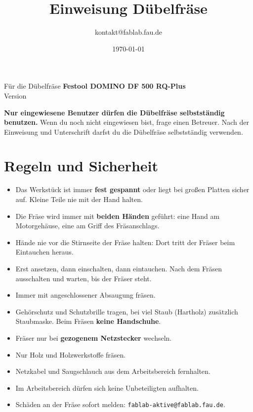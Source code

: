 \documentclass{\basedir/fablab-document}
\date{\today}
\author{kontakt@fablab.fau.de}
\title{Einweisung Dübelfräse}
\begin{document}
	\maketitle
	\begin{center}
		Für die Dübelfräse \textbf{Festool DOMINO DF 500 RQ-Plus}\\[1mm]
		{\small Version \Version}
	\end{center}

	\textbf{Nur eingewiesene Benutzer dürfen die Dübelfräse selbstständig benutzen.}
	Wenn du noch nicht eingewiesen bist, frage einen Betreuer. Nach der Einweisung und Unterschrift darfst du die Dübelfräse selbstständig verwenden.

	\section{Regeln und Sicherheit}

	\begin{itemize}
		\item Das Werkstück ist immer \textbf{fest gespannt} oder liegt bei großen Platten sicher auf. Kleine Teile nie mit der Hand halten.
		\item Die Fräse wird immer mit \textbf{beiden Händen} geführt: eine Hand am Motorgehäuse, eine am Griff des Fräsanschlags.
		\item Hände nie vor die Stirnseite der Fräse halten: Dort tritt der Fräser beim Eintauchen heraus.
		\item Erst ansetzen, dann einschalten, dann eintauchen. Nach dem Fräsen ausschalten und warten, bis der Fräser steht.
		\item Immer mit angeschlossener Absaugung fräsen.
		\item Gehörschutz und Schutzbrille tragen, bei viel Staub (Hartholz) zusätzlich Staubmaske. Beim Fräsen \textbf{keine Handschuhe}.
		\item Fräser nur bei \textbf{gezogenem Netzstecker} wechseln.
		\item Nur Holz und Holzwerkstoffe fräsen.
		\item Netzkabel und Saugschlauch aus dem Arbeitsbereich fernhalten.
		\item Im Arbeitsbereich dürfen sich keine Unbeteiligten aufhalten.
		\item Schäden an der Fräse sofort melden: \texttt{fablab-aktive@fablab.fau.de}.
	\end{itemize}

\end{document}
